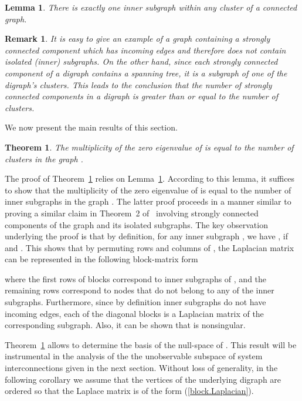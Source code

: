 \documentclass[a4paper,10pt,conference]{ieeeconf}
\newtheorem{theorem}{Theorem}
\newtheorem{remark}{Remark}
\newtheorem{lemma}{Lemma}
\begin{document}
\begin{lemma}\label{inner.prop}
There is exactly one inner subgraph within any cluster of a
connected graph. 
\end{lemma}


\begin{remark}
It is easy to give an example of a graph containing a strongly connected
component which has incoming edges and therefore does not contain isolated
(inner) 
subgraphs. On the other hand, 
since each strongly connected component of a digraph contains a spanning
tree, it is a subgraph of one of the digraph's clusters. This leads to the
conclusion that the number of strongly connected components in a digraph is
greater than or equal to the number of clusters. 
\end{remark}

We now present the main results of this section.  

\begin{theorem}\label{T1}
The multiplicity of the zero eigenvalue of  is equal to the
number of clusters in the graph . 
\end{theorem}

The proof of Theorem~\ref{T1} 
relies on  Lemma~\ref{inner.prop}. According to this lemma, it suffices to
show that the 
multiplicity of the zero eigenvalue of  is equal to the 
number of  inner subgraphs in the graph . The latter proof
proceeds in a manner similar to proving a similar claim in Theorem~2
of~\cite{FFS-2010} involving strongly connected components of the graph and
its isolated subgraphs. The key observation underlying the proof is that 
by definition, for any  inner
subgraph , we have , if
 and .   
This shows that by permuting rows and
columns of , the Laplacian matrix can be represented in the
following block-matrix form  

where the first  rows of blocks correspond to  inner subgraphs
of , and the remaining rows correspond to nodes that do not
belong to any of the  inner subgraphs. Furthermore, since by
definition  inner subgraphs do not have incoming edges, each of the
diagonal blocks  is a Laplacian matrix of the
corresponding subgraph. Also, it can be shown that  is nonsingular.

Theorem~\ref{T1} allows to determine the basis of the null-space of
. This result will be instrumental in the analysis of the
the unobservable subspace of system interconnections given in the next
section. Without loss of generality, in the following corollary we assume
that the vertices of the underlying digraph are ordered so that the Laplace
matrix  is of the form (\ref{block.Laplacian}). 
\end{document}
